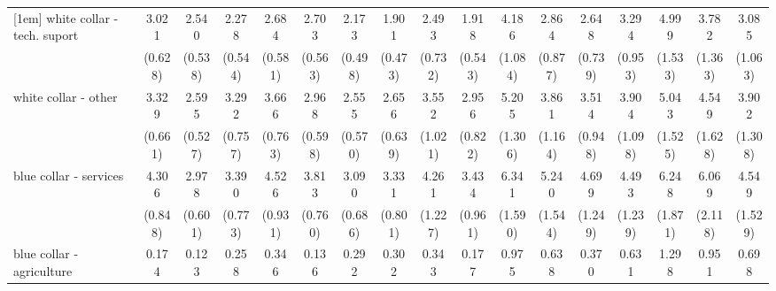 {\begin{tabular}{l*{16}{c}}
[1em]
white collar - tech. suport&       3.021\sym{***}&       2.540\sym{***}&       2.278\sym{***}&       2.684\sym{***}&       2.703\sym{***}&       2.173\sym{***}&       1.901\sym{**} &       2.493\sym{**} &       1.918\sym{*}  &       4.186\sym{***}&       2.864\sym{***}&       2.648\sym{***}&       3.294\sym{***}&       4.999\sym{***}&       3.782\sym{***}&       3.085\sym{**} \\
                    &     (0.628)         &     (0.538)         &     (0.544)         &     (0.581)         &     (0.563)         &     (0.498)         &     (0.473)         &     (0.732)         &     (0.543)         &     (1.084)         &     (0.877)         &     (0.739)         &     (0.953)         &     (1.533)         &     (1.363)         &     (1.063)         \\
[1em]
white collar - other&       3.329\sym{***}&       2.595\sym{***}&       3.292\sym{***}&       3.666\sym{***}&       2.968\sym{***}&       2.555\sym{***}&       2.656\sym{***}&       3.552\sym{***}&       2.956\sym{***}&       5.205\sym{***}&       3.861\sym{***}&       3.514\sym{***}&       3.904\sym{***}&       5.043\sym{***}&       4.549\sym{***}&       3.902\sym{***}\\
                    &     (0.661)         &     (0.527)         &     (0.757)         &     (0.763)         &     (0.598)         &     (0.570)         &     (0.639)         &     (1.021)         &     (0.822)         &     (1.306)         &     (1.164)         &     (0.948)         &     (1.098)         &     (1.525)         &     (1.628)         &     (1.308)         \\
[1em]
blue collar - services&       4.306\sym{***}&       2.978\sym{***}&       3.390\sym{***}&       4.526\sym{***}&       3.813\sym{***}&       3.090\sym{***}&       3.331\sym{***}&       4.261\sym{***}&       3.434\sym{***}&       6.341\sym{***}&       5.240\sym{***}&       4.699\sym{***}&       4.493\sym{***}&       6.248\sym{***}&       6.069\sym{***}&       4.549\sym{***}\\
                    &     (0.848)         &     (0.601)         &     (0.773)         &     (0.931)         &     (0.760)         &     (0.686)         &     (0.801)         &     (1.227)         &     (0.961)         &     (1.590)         &     (1.544)         &     (1.249)         &     (1.239)         &     (1.871)         &     (2.118)         &     (1.529)         \\
[1em]
blue collar - agriculture&       0.174\sym{***}&       0.123\sym{***}&       0.258\sym{**} &       0.346\sym{*}  &       0.136\sym{***}&       0.292\sym{*}  &       0.302\sym{**} &       0.343\sym{*}  &       0.177\sym{***}&       0.975         &       0.638         &       0.370         &       0.631         &       1.298         &       0.951         &       0.698         \\

\end{tabular}}
